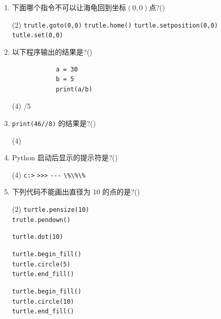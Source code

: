 \documentclass[11pt]{ctexart}
\begin{document}
\begin{enumerate}
        \item 下面哪个指令不可以让海龟回到坐标$(0, 0)$点?(\qquad)
        \begin{tasks}(2)
            \task \lstinline{trutle.goto(0,0)}
            \task \lstinline{trutle.home()}
            \task \lstinline{turtle.setposition(0,0)}
            \task \lstinline{tutle.set(0,0)}
        \end{tasks}

        \item 以下程序输出的结果是?(\qquad)
        \begin{lstlisting}
            a = 30
            b = 5
            print(a/b)
        \end{lstlisting}
        \begin{tasks}(4)
            /5
        \end{tasks}

        \item \lstinline{print(46//8)} 的结果是?(\qquad)
        \begin{tasks}(4)
        \end{tasks}

        \item Python 启动后显示的提示符是?(\qquad)
        \begin{tasks}(4)
            \task \lstinline{c:>}
            \task \lstinline{>>>}
            \task \lstinline{---}
            \task \lstinline{\%\%\%}
        \end{tasks}

        \item 下列代码不能画出直径为 10 的点的是?(\qquad)
        \begin{tasks}(2)
            \task \lstinline{turtle.pensize(10)}\\
            \lstinline{trutle.pendown()}

            \task \lstinline{turtle.dot(10)}

            \task \lstinline{turtle.begin_fill()}\\
            \lstinline{turtle.circle(5)}\\
            \lstinline{turtle.end_fill()}

            \task \lstinline{turtle.begin_fill()}\\
            \lstinline{turtle.circle(10)}\\
            \lstinline{turtle.end_fill()}
        \end{tasks}


\end{enumerate}
\end{document}
